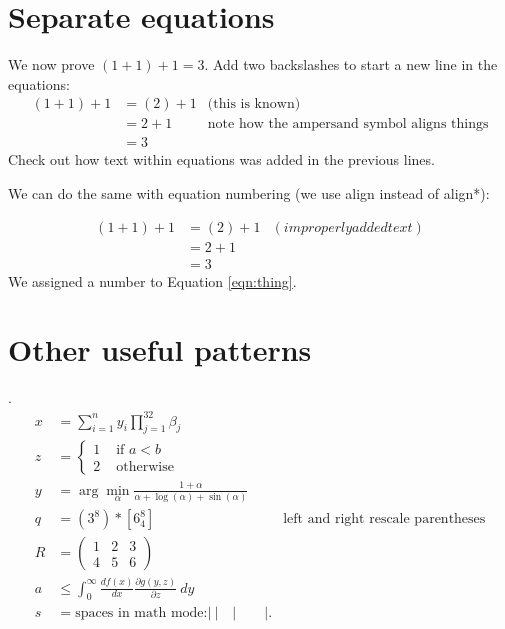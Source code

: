 \documentclass{amsart}
\begin{document}
\section{Separate equations}\label{sec:equation}
We now prove $(1+1)+1=3$. Add two backslashes to start a new line in the equations:
\begin{align*}
(1+1)+1 &= (2) + 1 & \text{(this is known)}\\
        &=2+1 &\text{note how the ampersand symbol aligns things}\\
        &=3
\end{align*}
Check out how text within equations was added in the previous lines.

We can do the same with equation numbering (we use align instead of align*):

\begin{align}
(1+1)+1 &= (2) + 1 & (improperly added text)\label{eqn:thing}\\
        &=2+1 \nonumber\\
        &=3\nonumber
\end{align}
We assigned a number to Equation \ref{eqn:thing}.

\section{Other useful patterns}.
\begin{align*}
x &= \sum\limits_{i=1}^{n} y_{i}\prod\limits_{j=1}^{32} \beta_{j}\\
z &= \begin{cases}
      1 & \text{ if }a<b\\
      2 & \text{ otherwise}
     \end{cases}\\
y &= \arg \min\limits_{\alpha} \frac{1+\alpha}{\alpha + \log(\alpha) + \sin(\alpha)}\\
q &= \left( 3^8 \right) * \left[6_4^8\right] & \text{left and right rescale parentheses}\\
R &= \left(
     \begin{matrix}
     1 & 2 & 3\\
     4 & 5 & 6
     \end{matrix}
     \right)\\
a &\leq \int_{0}^{\infty} \frac{df(x)}{dx} \frac{\partial g(y,z)}{\partial z}~dy\\
s &= \text{spaces in math mode:}|~|\quad|\qquad|.
\end{align*}
\end{document}
